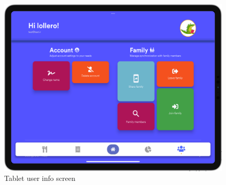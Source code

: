 \vspace*{-0.3cm}
\begin{figure}[H]
  \centering
    \includegraphics[scale=0.22]{./Images//Tablet_mocks/user1.png}
    \vspace*{-0.3cm}
    \caption{Tablet user info screen}
\end{figure}